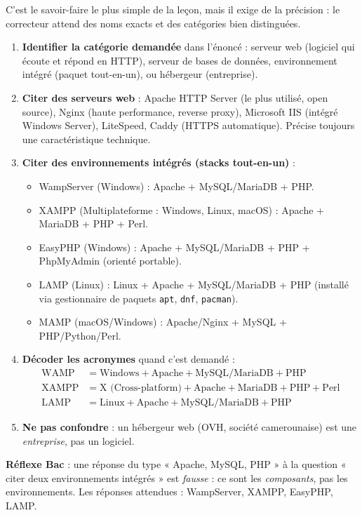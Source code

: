 \documentclass[11pt]{article}
\newcommand{\cle}[1]{{\popxbold\color{popdark}#1}}
\begin{document}
\begin{methode}
C'est le savoir-faire le plus simple de la leçon, mais il exige de la précision : le correcteur attend des \cle{noms exacts} et des \cle{catégories bien distinguées}.
\begin{enumerate}
\item \textbf{Identifier la catégorie demandée} dans l'énoncé : serveur web (logiciel qui écoute et répond en HTTP), serveur de bases de données, environnement intégré (paquet tout-en-un), ou hébergeur (entreprise).
\item \textbf{Citer des serveurs web} : \cle{Apache HTTP Server} (le plus utilisé, open source), \cle{Nginx} (haute performance, reverse proxy), \cle{Microsoft IIS} (intégré Windows Server), \cle{LiteSpeed}, \cle{Caddy} (HTTPS automatique). Précise toujours une caractéristique technique.
\item \textbf{Citer des environnements intégrés (stacks tout-en-un)} :
\begin{itemize}
\item \cle{WampServer} (Windows) : Apache + MySQL/MariaDB + PHP.
\item \cle{XAMPP} (Multiplateforme : Windows, Linux, macOS) : Apache + MariaDB + PHP + Perl.
\item \cle{EasyPHP} (Windows) : Apache + MySQL/MariaDB + PHP + PhpMyAdmin (orienté portable).
\item \cle{LAMP} (Linux) : Linux + Apache + MySQL/MariaDB + PHP (installé via gestionnaire de paquets \texttt{apt}, \texttt{dnf}, \texttt{pacman}).
\item \cle{MAMP} (macOS/Windows) : Apache/Nginx + MySQL + PHP/Python/Perl.
\end{itemize}
\item \textbf{Décoder les acronymes} quand c'est demandé :
\begin{align*}
\text{WAMP} &= \text{Windows} + \text{Apache} + \text{MySQL/MariaDB} + \text{PHP} \\
\text{XAMPP} &= \text{X (Cross-platform)} + \text{Apache} + \text{MariaDB} + \text{PHP} + \text{Perl} \\
\text{LAMP} &= \text{Linux} + \text{Apache} + \text{MySQL/MariaDB} + \text{PHP}
\end{align*}
\item \textbf{Ne pas confondre} : un hébergeur web (OVH, société camerounaise) est une \emph{entreprise}, pas un logiciel.
\end{enumerate}
\textbf{Réflexe Bac} : une réponse du type « Apache, MySQL, PHP » à la question « citer deux environnements intégrés » est \emph{fausse} : ce sont les \emph{composants}, pas les environnements. Les réponses attendues : WampServer, XAMPP, EasyPHP, LAMP.
\end{methode}
\end{document}
